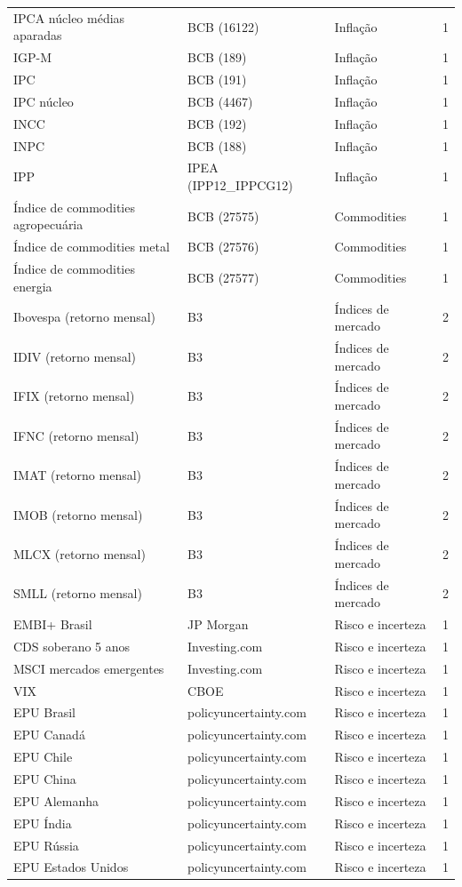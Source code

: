 \documentclass[
article,			%
12pt,				%
oneside,			%
a4paper,			%
hidelinks, 
english,			%
brazil,				%
]{abntex2}
\theoremstyle{plain}
\theoremstyle{definition}
\theoremstyle{remark}
\begin{document}
\begin{anexosenv}
\begin{ThreePartTable}
\begin{longtable}{@{}p{5.2cm} l l c@{}}
IPCA núcleo médias aparadas & BCB (16122) & Inflação & 1 \\
IGP-M & BCB (189) & Inflação & 1 \\
IPC & BCB (191) & Inflação & 1 \\
IPC núcleo & BCB (4467) & Inflação & 1 \\
INCC & BCB (192) & Inflação & 1 \\
INPC & BCB (188) & Inflação & 1 \\
IPP & IPEA (IPP12\_IPPCG12) & Inflação & 1 \\
Índice de commodities agropecuária & BCB (27575) & Commodities & 1 \\
Índice de commodities metal & BCB (27576) & Commodities & 1 \\
Índice de commodities energia & BCB (27577) & Commodities & 1 \\
Ibovespa (retorno mensal) & B3 & Índices de mercado & 2 \\
IDIV (retorno mensal) & B3 & Índices de mercado & 2 \\
IFIX (retorno mensal) & B3 & Índices de mercado & 2 \\
IFNC (retorno mensal) & B3 & Índices de mercado & 2 \\
IMAT (retorno mensal) & B3 & Índices de mercado & 2 \\
IMOB (retorno mensal) & B3 & Índices de mercado & 2 \\
MLCX (retorno mensal) & B3 & Índices de mercado & 2 \\
SMLL (retorno mensal) & B3 & Índices de mercado & 2 \\
EMBI+ Brasil & JP Morgan & Risco e incerteza & 1 \\
CDS soberano 5 anos & Investing.com & Risco e incerteza & 1 \\
MSCI mercados emergentes & Investing.com & Risco e incerteza & 1 \\
VIX & CBOE & Risco e incerteza & 1 \\
EPU Brasil & policyuncertainty.com & Risco e incerteza & 1 \\
EPU Canadá & policyuncertainty.com & Risco e incerteza & 1 \\
EPU Chile & policyuncertainty.com & Risco e incerteza & 1 \\
EPU China & policyuncertainty.com & Risco e incerteza & 1 \\
EPU Alemanha & policyuncertainty.com & Risco e incerteza & 1 \\
EPU Índia & policyuncertainty.com & Risco e incerteza & 1 \\
EPU Rússia & policyuncertainty.com & Risco e incerteza & 1 \\
EPU Estados Unidos & policyuncertainty.com & Risco e incerteza & 1 \\

\end{longtable}
\end{ThreePartTable}


\end{anexosenv}
\end{document}
